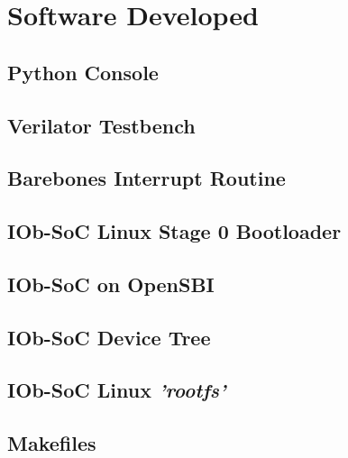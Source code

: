 \chapter{Software Developed}

\section{Python Console}

\section{Verilator Testbench}

\section{Barebones Interrupt Routine}

\section{IOb-SoC Linux Stage 0 Bootloader}

\section{IOb-SoC on OpenSBI}

\section{IOb-SoC Device Tree}

\section{IOb-SoC Linux \textit{'rootfs'}}

\section{Makefiles}